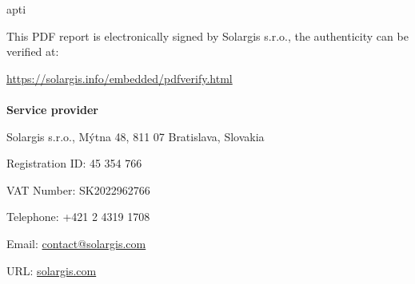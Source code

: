 apti     \documentclass[10pt,a4paper,UTF8]{article}
\begin{document}
{\begin{description}[noitemsep]
\item This PDF report is electronically signed by Solargis s.r.o., the authenticity can be verified at:\item \url{https://solargis.info/embedded/pdfverify.html}
\end{description}\paragraph{}\textbf{Service provider}\begin{description}[noitemsep]
\item Solargis s.r.o., Mýtna 48, 811 07 Bratislava, Slovakia\item Registration ID: 45 354 766\item VAT Number: SK2022962766\item Telephone: +421 2 4319 1708\item Email: \href{mailto:contact@solargis.com}{contact@solargis.com}\item URL: \url{solargis.com}
\end{description}

%

}  %

\end{document}
